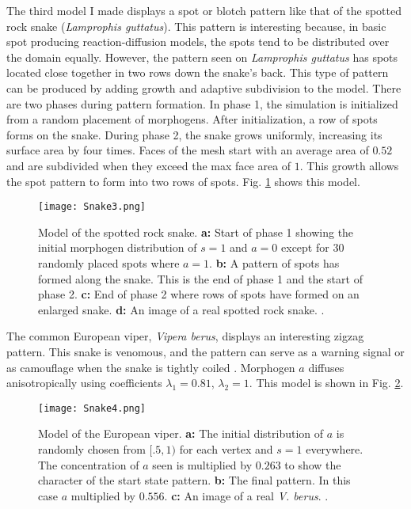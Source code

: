 The third model I made displays a spot or blotch pattern like that of the spotted rock snake (\textit{Lamprophis guttatus}). This pattern is interesting because, in basic spot producing reaction-diffusion models, the spots tend to be distributed over the domain equally. However, the pattern seen on \textit{Lamprophis guttatus} has spots located close together in two rows down the snake's back. This type of pattern can be produced by adding growth and adaptive subdivision to the model. There are two phases during pattern formation. In phase 1, the simulation is initialized from a random placement of morphogens. After initialization, a row of spots forms on the snake. During phase 2, the snake grows uniformly, increasing its surface area by four times. Faces of the mesh start with an average area of $0.52$ and are subdivided when they exceed the max face area of $1$. This growth allows the spot pattern to form into two rows of spots. Fig. \ref{fig:Snake3} shows this model.

\begin{figure}[ht]
	\centering
	\texttt{[image: Snake3.png]}
	\caption[Model of the spotted rock snake]{Model of the spotted rock snake. \textbf{a:} Start of phase 1 showing the initial morphogen distribution of $s=1$ and $a=0$ except for 30 randomly placed spots where $a=1$. \textbf{b:} A pattern of spots has formed along the snake. This is the end of phase 1 and the start of phase 2. \textbf{c:} End of phase 2 where rows of spots have formed on an enlarged snake. \textbf{d:} An image of a real spotted rock snake. .}
	\label{fig:Snake3}
\end{figure}

\newpage


The common European viper, \textit{Vipera berus}, displays an interesting zigzag pattern. This snake is venomous, and the pattern can serve as a warning signal or as camouflage when the snake is tightly coiled \citep{lillywhite2014}. Morphogen $a$ diffuses anisotropically using coefficients $\lambda_{1}=0.81$, $\lambda_{2}=1$. This model is shown in Fig. \ref{fig:Snake4}.

\begin{figure}[ht]
	\centering
	\texttt{[image: Snake4.png]}
	\caption[Model of the European viper]{Model of the European viper. \textbf{a:} The initial distribution of $a$ is randomly chosen from $[.5, 1)$ for each vertex and $s=1$ everywhere. The concentration of $a$ seen is multiplied by $0.263$ to show the character of the start state pattern. \textbf{b:} The final pattern. In this case $a$ multiplied by $0.556$. \textbf{c:} An image of a real \textit{V. berus}. .}
	\label{fig:Snake4}
\end{figure}


